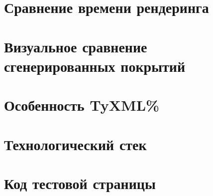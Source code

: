 


\appendix
{}
\section{Сравнение времени рендеринга}


\section{Визуальное сравнение сгенерированных покрытий}
\label{apx:coverage}


\section{Особенность TyXML\%}
\label{apx:tyxml_performance}


\section{Технологический стек}
\label{apx:versions}


\section{Код тестовой страницы}
\label{apx:test_page}
% 



